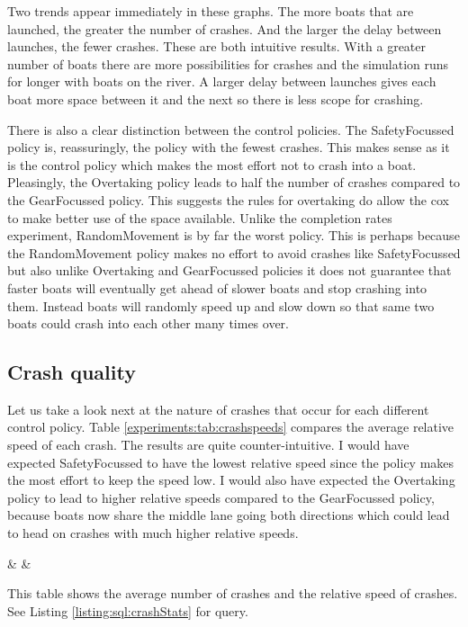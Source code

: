   Two trends appear immediately in these graphs. The more boats that are launched, the greater the number of crashes. And the larger the delay between launches, the fewer crashes. These are both intuitive results. With a greater number of boats there are more possibilities for crashes and the simulation runs for longer with boats on the river. A larger delay between launches gives each boat more space between it and the next so there is less scope for crashing.
  
  There is also a clear distinction between the control policies. The SafetyFocussed policy is, reassuringly, the policy with the fewest crashes. This makes sense as it is the control policy which makes the most effort not to crash into a boat. Pleasingly, the Overtaking policy leads to half the number of crashes compared to the GearFocussed policy. This suggests the rules for overtaking do allow the cox to make better use of the space available. Unlike the completion rates experiment, RandomMovement is by far the worst policy. This is perhaps because the RandomMovement policy makes no effort to avoid crashes like SafetyFocussed but also unlike Overtaking and GearFocussed policies it does not guarantee that faster boats will eventually get ahead of slower boats and stop crashing into them. Instead boats will randomly speed up and slow down so that same two boats could crash into each other many times over.

  \subsection{Crash quality}
  Let us take a look next at the nature of crashes that occur for each different control policy. Table \ref{experiments:tab:crashspeeds} compares the average relative speed of each crash. The results are quite counter-intuitive. I would have expected SafetyFocussed to have the lowest relative speed since the policy makes the most effort to keep the speed low. I would also have expected the Overtaking policy to lead to higher relative speeds compared to the GearFocussed policy, because boats now share the middle lane going both directions which could lead to head on crashes with much higher relative speeds.
  
  \begin{table}[h]
  \centering
  {\cp & \crashes & \speed}
  \caption{This table shows the average number of crashes and the relative speed of crashes. See Listing \ref{listing:sql:crashStats} for query.}
  \label{experiments:tab:crashspeeds}
  \end{table}
  
